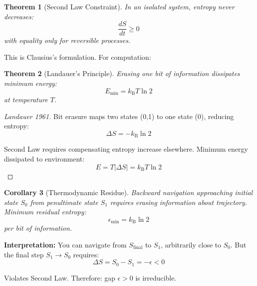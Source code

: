 \documentclass[twocolumn,10pt]{article}
\newtheorem{theorem}{Theorem}[section]
\newtheorem{corollary}[theorem]{Corollary}
\theoremstyle{definition}
\theoremstyle{remark}
\newcommand{\kB}{k_{\text{B}}}
\begin{document}
\begin{theorem}[Second Law Constraint]
\label{thm:second_law}
In an isolated system, entropy never decreases:
\begin{equation}
\frac{dS}{dt} \geq 0
\end{equation}
with equality only for reversible processes.
\end{theorem}

\noindent This is Clausius's formulation\cite{clausius1865}. For computation:

\begin{theorem}[Landauer's Principle]
\label{thm:landauer}
Erasing one bit of information dissipates minimum energy:
\begin{equation}
E_{\min} = \kB T \ln 2
\end{equation}
at temperature $T$.
\end{theorem}

\begin{proof}[Landauer 1961\cite{landauer1961}]
Bit erasure maps two states (0,1) to one state (0), reducing entropy:
\begin{equation}
\Delta S = -\kB \ln 2
\end{equation}

Second Law requires compensating entropy increase elsewhere. Minimum energy dissipated to environment:
\begin{equation}
E = T |\Delta S| = \kB T \ln 2
\end{equation}
\end{proof}

\begin{corollary}[Thermodynamic Residue]
\label{thm:landauer_residue}
Backward navigation approaching initial state $S_0$ from penultimate state $S_1$ requires erasing information about trajectory. Minimum residual entropy:
\begin{equation}
\epsilon_{\min} = \kB \ln 2
\end{equation}
per bit of information.
\end{corollary}

\vspace{0.2cm}
\noindent\textbf{Interpretation:} You can navigate from $S_{\text{final}}$ to $S_1$, arbitrarily close to $S_0$. But the final step $S_1 \to S_0$ requires:
\begin{equation}
\Delta S = S_0 - S_1 = -\epsilon < 0
\end{equation}

Violates Second Law. Therefore: gap $\epsilon > 0$ is irreducible.
\end{document}
